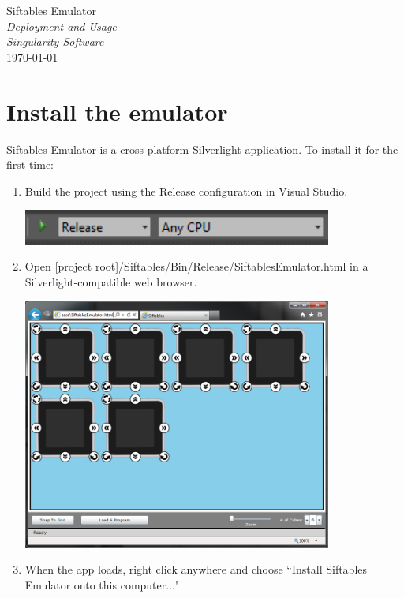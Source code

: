 \documentclass[12pt]{article}
\begin{document}
\begin{center}
    \LARGE{Siftables Emulator} \\
    \LARGE{\textit{Deployment and Usage}}\\
    \Large{\textit{Singularity Software}} \\
    \vspace{.05in}
    \normalsize{\today} \\
\end{center}

\section{Install the emulator}
Siftables Emulator is a cross-platform Silverlight application. To install it for the first time:
\begin{enumerate}
\item Build the project using the Release configuration in Visual Studio.
\begin{center}\includegraphics[width=4in]{0-1ReleaseBuild}\end{center}
\item Open [project root]/Siftables/Bin/Release/SiftablesEmulator.html in a Silverlight-compatible web browser.
\begin{center}\includegraphics[width=4in]{0-2WebBrowser}\end{center}
\item When the app loads, right click anywhere and choose ``Install Siftables Emulator onto this computer..."

\end{enumerate}
\end{document}
